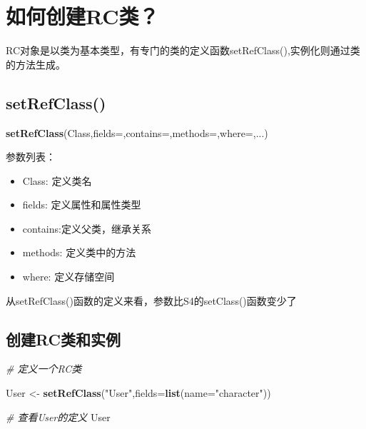 \documentclass[]{book}
\newenvironment{Shaded}{\begin{snugshade}}{\end{snugshade}}
\newcommand{\KeywordTok}[1]{\textcolor[rgb]{0.13,0.29,0.53}{\textbf{#1}}}
\newcommand{\DataTypeTok}[1]{\textcolor[rgb]{0.13,0.29,0.53}{#1}}
\newcommand{\StringTok}[1]{\textcolor[rgb]{0.31,0.60,0.02}{#1}}
\newcommand{\CommentTok}[1]{\textcolor[rgb]{0.56,0.35,0.01}{\textit{#1}}}
\newcommand{\NormalTok}[1]{#1}
\begin{document}
\section{如何创建RC类？}\label{rc}

RC对象是以类为基本类型，有专门的类的定义函数setRefClass(),实例化则通过类的方法生成。

\subsection{setRefClass()}\label{setrefclass}

\begin{Shaded}
\begin{Highlighting}[]
\KeywordTok{setRefClass}\NormalTok{(Class,}\DataTypeTok{fields=}\NormalTok{,}\DataTypeTok{contains=}\NormalTok{,}\DataTypeTok{methods=}\NormalTok{,}\DataTypeTok{where=}\NormalTok{,...)}
\end{Highlighting}
\end{Shaded}

参数列表：

\begin{itemize}
\item
  Class: 定义类名
\item
  fields: 定义属性和属性类型
\item
  contains:定义父类，继承关系
\item
  methods: 定义类中的方法
\item
  where: 定义存储空间
\end{itemize}

从setRefClass()函数的定义来看，参数比S4的setClass()函数变少了

\subsection{创建RC类和实例}\label{rc}

\begin{Shaded}
\begin{Highlighting}[]
\CommentTok{# 定义一个RC类}

\NormalTok{User <-}\StringTok{ }\KeywordTok{setRefClass}\NormalTok{(}\StringTok{"User"}\NormalTok{,}\DataTypeTok{fields=}\KeywordTok{list}\NormalTok{(}\DataTypeTok{name=}\StringTok{"character"}\NormalTok{))}

\CommentTok{# 查看User的定义}
\NormalTok{User}
\end{Highlighting}
\end{Shaded}
\end{document}
